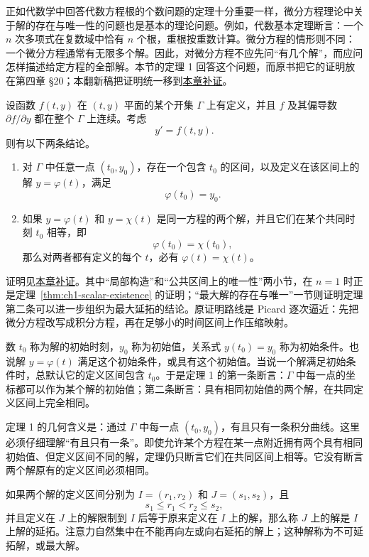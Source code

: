 正如代数学中回答代数方程根的个数问题的定理十分重要一样，微分方程理论中关于解的存在与唯一性的问题也是基本的理论问题。例如，代数基本定理断言：一个 \(n\) 次多项式在复数域中恰有 \(n\) 个根，重根按重数计算。微分方程的情形则不同：一个微分方程通常有无限多个解。因此，对微分方程不应先问“有几个解”，而应问怎样描述给定方程的全部解。本节的定理 1 回答这个问题，而原书把它的证明放在第四章 §20；本翻新稿把证明统一移到\hyperref[sec:existence-proofs]{本章补证}。

\begin{theorem}[一阶标量方程的存在唯一性]
 \label{thm:ch1-scalar-existence}
 设函数 \(f(t,y)\) 在 \((t,y)\) 平面的某个开集 \(\Gamma\) 上有定义，并且 \(f\) 及其偏导数 \(\partial f/\partial y\) 都在整个 \(\Gamma\) 上连续。考虑
 \[
  y'=f(t,y).
 \]
 则有以下两条结论。
 \begin{enumerate}[label=\arabic*.]
  \item 对 \(\Gamma\) 中任意一点 \((t_0,y_0)\)，存在一个包含 \(t_0\) 的区间，以及定义在该区间上的解 \(y=\varphi(t)\)，满足
  \[
   \varphi(t_0)=y_0.
  \]
  \item 如果 \(y=\varphi(t)\) 和 \(y=\chi(t)\) 是同一方程的两个解，并且它们在某个共同时刻 \(t_0\) 相等，即
  \[
   \varphi(t_0)=\chi(t_0),
  \]
  那么对两者都有定义的每个 \(t\)，必有 \(\varphi(t)=\chi(t)\)。
 \end{enumerate}
\end{theorem}

证明见\hyperref[sec:existence-proofs]{本章补证}。其中“局部构造”和“公共区间上的唯一性”两小节，在 \(n=1\) 时正是定理~\ref{thm:ch1-scalar-existence} 的证明；“最大解的存在与唯一”一节则证明定理第二条可以进一步组织为最大延拓的结论。原证明路线是 Picard 逐次逼近：先把微分方程改写成积分方程，再在足够小的时间区间上作压缩映射。

数 \(t_0\) 称为解的初始时刻，\(y_0\) 称为初始值，关系式 \(y(t_0)=y_0\) 称为初始条件。也说解 \(y=\varphi(t)\) 满足这个初始条件，或具有这个初始值。当说一个解满足初始条件时，总默认它的定义区间包含 \(t_0\)。于是定理 1 的第一条断言：\(\Gamma\) 中每一点的坐标都可以作为某个解的初始值；第二条断言：具有相同初始值的两个解，在共同定义区间上完全相同。

定理 1 的几何含义是：通过 \(\Gamma\) 中每一点 \((t_0,y_0)\)，有且只有一条积分曲线。这里必须仔细理解“有且只有一条”。即使允许某个方程在某一点附近拥有两个具有相同初始值、但定义区间不同的解，定理仍只断言它们在共同区间上相等。它没有断言两个解原有的定义区间必须相同。

如果两个解的定义区间分别为 \(I=(r_1,r_2)\) 和 \(J=(s_1,s_2)\)，且
\[
 s_1\le r_1<r_2\le s_2,
\]
并且定义在 \(J\) 上的解限制到 \(I\) 后等于原来定义在 \(I\) 上的解，那么称 \(J\) 上的解是 \(I\) 上解的延拓。注意力自然集中在不能再向左或向右延拓的解上；这种解称为不可延拓解，或最大解。

